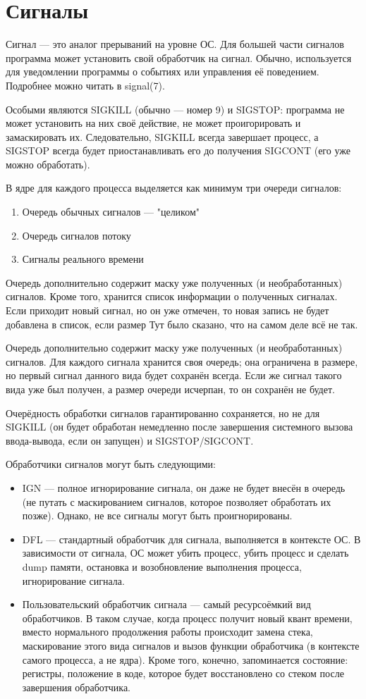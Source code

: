 \documentclass[main]{subfiles}
\begin{document}
\chapter{Сигналы}
Сигнал --- это аналог прерываний на уровне ОС. Для большей части
сигналов программа может установить свой обработчик на сигнал.
Обычно, используется для уведомлении программы о событиях или управления
её поведением. Подробнее можно читать в signal(7).

Особыми являются SIGKILL (обычно --- номер 9) и SIGSTOP: программа не может
установить на них своё действие, не может проигорировать и замаскировать их.
Следовательно, SIGKILL всегда завершает процесс, а SIGSTOP всегда будет
приостанавливать его до получения SIGCONT (его уже можно обработать).

В ядре для каждого процесса выделяется как минимум три очереди сигналов:
\begin{enumerate}
\item Очередь обычных сигналов --- "целиком"
\item Очередь сигналов потоку
\item Сигналы реального времени
\end{enumerate}

Очередь дополнительно содержит маску уже полученных (и необработанных) сигналов.
Кроме того, хранится список информации о полученных сигналах.
Если приходит новый сигнал, но он
уже отмечен, то новая запись не будет добавлена в список, если размер
Тут было сказано, что на самом деле всё не так.

Очередь дополнительно содержит маску уже полученных (и необработанных) сигналов.
Для каждого сигнала хранится своя очередь; она ограничена
в размере, но первый сигнал данного вида будет сохранён всегда.
Если же сигнал такого вида уже был получен, а размер очереди исчерпан, то
он сохранён не будет.

Очерёдность обработки сигналов гарантированно сохраняется, но не для SIGKILL
(он будет обработан немедленно после завершения системного вызова ввода-вывода,
если он запущен) и SIGSTOP/SIGCONT.

Обработчики сигналов могут быть следующими:
\begin{itemize}
\item IGN --- полное игнорирование сигнала, он даже не будет внесён в
очередь (не путать с маскированием сигналов, которое позволяет обработать
их позже). Однако, не все сигналы могут быть проигнорированы.
\item DFL --- стандартный обработчик для сигнала, выполняется в контексте ОС.
В зависимости от сигнала, ОС может убить процесс, убить процесс и сделать dump
памяти, остановка и возобновление выполнения процесса, игнорирование сигнала.
\item Пользовательский обработчик сигнала --- самый ресурсоёмкий вид обработчиков.
В таком случае, когда процесс получит новый квант времени, вместо нормального
продолжения работы происходит замена стека, маскирование этого вида сигналов
и вызов функции обработчика (в контексте самого процесса, а не ядра).
Кроме того, конечно, запоминается состояние: регистры, положение в коде,
которое будет восстановлено со стеком после завершения обработчика.
\end{itemize}
\end{document}
